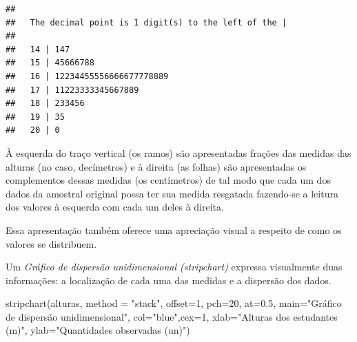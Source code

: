 \documentclass[
]{book}
\newenvironment{Shaded}{\begin{snugshade}}{\end{snugshade}}
\newcommand{\AttributeTok}[1]{\textcolor[rgb]{0.77,0.63,0.00}{#1}}
\newcommand{\DecValTok}[1]{\textcolor[rgb]{0.00,0.00,0.81}{#1}}
\newcommand{\FloatTok}[1]{\textcolor[rgb]{0.00,0.00,0.81}{#1}}
\newcommand{\FunctionTok}[1]{\textcolor[rgb]{0.00,0.00,0.00}{#1}}
\newcommand{\NormalTok}[1]{#1}
\newcommand{\StringTok}[1]{\textcolor[rgb]{0.31,0.60,0.02}{#1}}
\begin{document}
\begin{verbatim}
## 
##   The decimal point is 1 digit(s) to the left of the |
## 
##   14 | 147
##   15 | 45666788
##   16 | 12234455556666677778889
##   17 | 11223333345667889
##   18 | 233456
##   19 | 35
##   20 | 0
\end{verbatim}

\hfill\break

À esquerda do traço vertical (os ramos) são apresentadas frações das medidas das alturas (no caso, decímetros) e à direita (as folhas) são apresentadas os complementos dessas medidas (os centímetros) de tal modo que cada um dos dados da amostral original possa ter sua medida resgatada fazendo-se a leitura dos valores à esquerda com cada um deles à direita.

\hfill\break

Essa apresentação também oferece uma apreciação visual a respeito de como os valores se distribuem.

\hfill\break

Um \emph{Gráfico de dispersão unidimensional (stripchart)} expressa visualmente duas informações: a localização de cada uma das medidas e a dispersão dos dados.

\hfill\break

\begin{Shaded}
\begin{Highlighting}[]
\FunctionTok{stripchart}\NormalTok{(alturas, }\AttributeTok{method =} \StringTok{"stack"}\NormalTok{, }\AttributeTok{offset=}\DecValTok{1}\NormalTok{,}
           \AttributeTok{pch=}\DecValTok{20}\NormalTok{, }\AttributeTok{at=}\FloatTok{0.5}\NormalTok{,}
           \AttributeTok{main=}\StringTok{"Gráfico de dispersão unidimensional"}\NormalTok{,}
           \AttributeTok{col=}\StringTok{"blue"}\NormalTok{,}\AttributeTok{cex=}\DecValTok{1}\NormalTok{,}
           \AttributeTok{xlab=}\StringTok{"Alturas dos estudantes (m)"}\NormalTok{,}
           \AttributeTok{ylab=}\StringTok{"Quantidades observadas (un)"}\NormalTok{)}
\end{Highlighting}
\end{Shaded}
\end{document}
